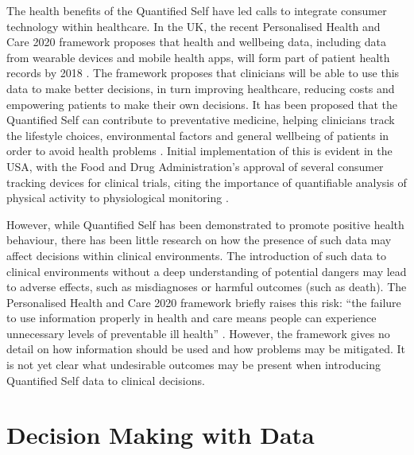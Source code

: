 \documentclass{chi-ext}
\begin{document}

  The health benefits of the Quantified Self have led calls to integrate consumer technology within healthcare. In the UK, the recent Personalised Health and Care 2020 framework proposes that health and wellbeing data, including data from wearable devices and mobile health apps, will form part of patient health records by 2018 \cite{Personalised2014}. The framework proposes that clinicians will be able to use this data to make better decisions, in turn improving healthcare, reducing costs and empowering patients to make their own decisions. It has been proposed that the Quantified Self can contribute to preventative medicine, helping clinicians track the lifestyle choices, environmental factors and general wellbeing of patients in order to avoid health problems \cite{Swan2009}. Initial implementation of this is evident in the USA, with the Food and Drug Administration's approval of several consumer tracking devices for clinical trials, citing the importance of quantifiable analysis of physical activity to physiological monitoring \cite{U.S.FoodandDrugAdministration2014}.

  However, while Quantified Self has been demonstrated to promote positive health behaviour, there has been little research on how the presence of such data may affect decisions within clinical environments. The introduction of such data to clinical environments without a deep understanding of potential dangers may lead to adverse effects, such as misdiagnoses or harmful outcomes (such as death). The Personalised Health and Care 2020 framework briefly raises this risk: ``the failure to use information properly in health and care means people can experience unnecessary levels of preventable ill health'' \cite{Personalised2014}. However, the framework gives no detail on how information should be used and how problems may be mitigated. It is not yet clear what undesirable outcomes may be present when introducing Quantified Self data to clinical decisions.



\section{Decision Making with Data}
\end{document}
